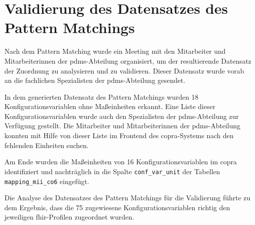 \section{Validierung des Datensatzes des Pattern Matchings } \label{sec:validmethode}

Nach dem Pattern Matching wurde ein Meeting mit den Mitarbeiter und Mitarbeiterinnen der \ac{pdms}-Abteilung organisiert, um der resultierende Datensatz der Zuordnung zu analysieren und zu validieren. Dieser Datensatz wurde vorab an die fachlichen Spezialisten der \ac{pdms}-Abteilung gesendet.

In dem generierten Datensatz des Pattern Matchings wurden 18 Konfigurationsvariablen ohne Maßeinheiten erkannt. Eine Liste dieser Konfigurationsvariablen wurde auch den Spezialisten der \ac{pdms}-Abteilung zur Verfügung gestellt. Die Mitarbeiter und Mitarbeiterinnen der \ac{pdms}-Abteilung konnten mit Hilfe von dieser Liste im Frontend des \ac{copra}-Systems nach den fehlenden Einheiten suchen.

Am Ende wurden die Maßeinheiten von 16 Konfigurationsvariablen im \ac{copra} identifiziert und nachträglich in die Spalte \texttt{conf\_var\_unit} der Tabellen \texttt{mapping\_mii\_co6} eingefügt.

Die Analyse des Datensatzes des Pattern Matchings für die Validierung führte zu dem Ergebnis, dass die 75 zugewiesene Konfigurationsvariablen richtig den jeweiligen \ac{fhir}-Profilen zugeordnet wurden.